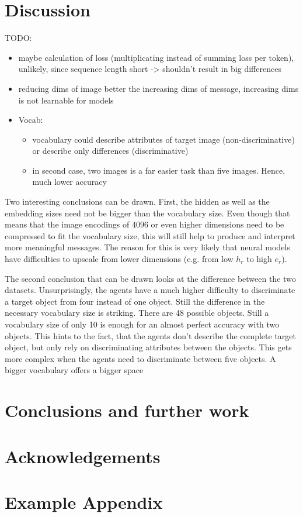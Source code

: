\documentclass[11pt]{article}
\begin{document}
\section{Discussion}
TODO:
\begin{itemize}
  \item maybe calculation of loss (multiplicating instead of summing loss per token), unlikely, since sequence length short -> shouldn't result in big differences
  \item reducing dims of image better the increasing dims of message, increasing dims is not learnable for models
  \item Vocab:
        \begin{itemize}
          \item vocabulary could describe attributes of target image (non-discriminative) or describe only differences (discriminative)
          \item in second case, two images is a far easier task than five images. Hence, much lower accuracy
        \end{itemize}
\end{itemize}

Two interesting conclusions can be drawn.
First, the hidden as well as the embedding sizes need not be bigger than the vocabulary size.
Even though that means that the image encodings of 4096 or even higher dimensions need to be compressed to fit the vocabulary size, this will still help to produce and interpret more meaningful messages.
The reason for this is very likely that neural models have difficulties to upscale from lower dimensions (e.g. from low $h_r$ to high $e_r$).

The second conclusion that can be drawn looks at the difference between the two datasets.
Unsurprisingly, the agents have a much higher difficulty to discriminate a target object from four instead of one object.
Still the difference in the necessary vocabulary size is striking.
There are 48 possible objects.
Still a vocabulary size of only 10 is enough for an almost perfect accuracy with two objects.
This hints to the fact, that the agents don't describe the complete target object, but only rely on discriminating attributes between the objects.
This gets more complex when the agents need to discriminate between five objects.
A bigger vocabulary offers a bigger space


\section{Conclusions and further work}

\section*{Acknowledgements}




\appendix

\section{Example Appendix}
\end{document}

